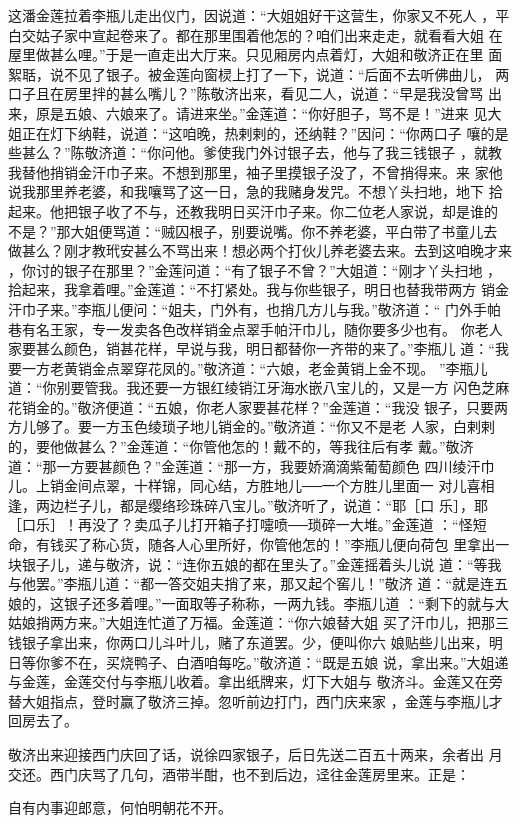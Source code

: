 这潘金莲拉着李瓶儿走出仪门，因说道：“大姐姐好干这营生，你家又不死人
，平白交姑子家中宣起卷来了。都在那里围着他怎的？咱们出来走走，就看看大姐
在屋里做甚么哩。”于是一直走出大厅来。只见厢房内点着灯，大姐和敬济正在里
面絮聒，说不见了银子。被金莲向窗棂上打了一下，说道：“后面不去听佛曲儿，
两口子且在房里拌的甚么嘴儿？”陈敬济出来，看见二人，说道：“早是我没曾骂
出来，原是五娘、六娘来了。请进来坐。”金莲道：“你好胆子，骂不是！”进来
见大姐正在灯下纳鞋，说道：“这咱晚，热剌剌的，还纳鞋？”因问：“你两口子
嚷的是些甚么？”陈敬济道：“你问他。爹使我门外讨银子去，他与了我三钱银子
，就教我替他捎销金汗巾子来。不想到那里，袖子里摸银子没了，不曾捎得来。来
家他说我那里养老婆，和我嚷骂了这一日，急的我赌身发咒。不想丫头扫地，地下
拾起来。他把银子收了不与，还教我明日买汗巾子来。你二位老人家说，却是谁的
不是？”那大姐便骂道：“贼囚根子，别要说嘴。你不养老婆，平白带了书童儿去
做甚么？刚才教玳安甚么不骂出来！想必两个打伙儿养老婆去来。去到这咱晚才来
，你讨的银子在那里？”金莲问道：“有了银子不曾？”大姐道：“刚才丫头扫地
，拾起来，我拿着哩。”金莲道：“不打紧处。我与你些银子，明日也替我带两方
销金汗巾子来。”李瓶儿便问：“姐夫，门外有，也捎几方儿与我。”敬济道：“
门外手帕巷有名王家，专一发卖各色改样销金点翠手帕汗巾儿，随你要多少也有。
你老人家要甚么颜色，销甚花样，早说与我，明日都替你一齐带的来了。”李瓶儿
道：“我要一方老黄销金点翠穿花凤的。”敬济道：“六娘，老金黄销上金不现。
”李瓶儿道：“你别要管我。我还要一方银红绫销江牙海水嵌八宝儿的，又是一方
闪色芝麻花销金的。”敬济便道：“五娘，你老人家要甚花样？”金莲道：“我没
银子，只要两方儿够了。要一方玉色绫琐子地儿销金的。”敬济道：“你又不是老
人家，白剌剌的，要他做甚么？”金莲道：“你管他怎的！戴不的，等我往后有孝
戴。”敬济道：“那一方要甚颜色？”金莲道：“那一方，我要娇滴滴紫葡萄颜色
四川绫汗巾儿。上销金间点翠，十样锦，同心结，方胜地儿──一个方胜儿里面一
对儿喜相逢，两边栏子儿，都是缨络珍珠碎八宝儿。”敬济听了，说道：“耶［口
乐］，耶［口乐］！再没了？卖瓜子儿打开箱子打嚏喷──琐碎一大堆。”金莲道
：“怪短命，有钱买了称心货，随各人心里所好，你管他怎的！”李瓶儿便向荷包
里拿出一块银子儿，递与敬济，说：“连你五娘的都在里头了。”金莲摇着头儿说
道：“等我与他罢。”李瓶儿道：“都一答交姐夫捎了来，那又起个窖儿！”敬济
道：“就是连五娘的，这银子还多着哩。”一面取等子称称，一两九钱。李瓶儿道
：“剩下的就与大姑娘捎两方来。”大姐连忙道了万福。金莲道：“你六娘替大姐
买了汗巾儿，把那三钱银子拿出来，你两口儿斗叶儿，赌了东道罢。少，便叫你六
娘贴些儿出来，明日等你爹不在，买烧鸭子、白酒咱每吃。”敬济道：“既是五娘
说，拿出来。”大姐递与金莲，金莲交付与李瓶儿收着。拿出纸牌来，灯下大姐与
敬济斗。金莲又在旁替大姐指点，登时赢了敬济三掉。忽听前边打门，西门庆来家
，金莲与李瓶儿才回房去了。

敬济出来迎接西门庆回了话，说徐四家银子，后日先送二百五十两来，余者出
月交还。西门庆骂了几句，酒带半酣，也不到后边，迳往金莲房里来。正是：

自有内事迎郎意，何怕明朝花不开。